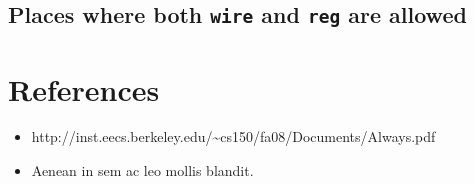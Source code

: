 \documentclass[a4paper,10pt]{article}
\theoremstyle{mytheor}
\begin{document}
\subsection{Places where both \lstinline[style=verilog-inline-style]{wire} and \lstinline[style=verilog-inline-style]{reg} are allowed}


\section*{References}
\begin{itemize}
  \small 
\item http://inst.eecs.berkeley.edu/{\textasciitilde}cs150/fa08/Documents/Always.pdf
\item Aenean in sem ac leo mollis blandit.  
\end{itemize}
\end{document}
